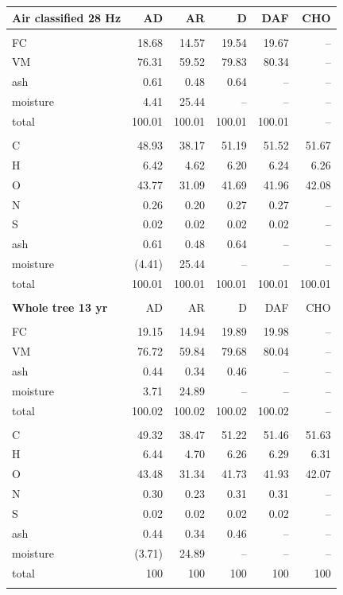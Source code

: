 \begin{longtable}{lrrrrr}
    \textbf{Air classified 28 Hz} & AD & AR & D & DAF & CHO \\
    \hline \\
    FC       & 18.68  & 14.57  & 19.54  & 19.67  & -- \\
    VM       & 76.31  & 59.52  & 79.83  & 80.34  & -- \\
    ash      & 0.61   & 0.48   & 0.64   & --     & -- \\
    moisture & 4.41   & 25.44  & --     & --     & -- \\
    total    & 100.01 & 100.01 & 100.01 & 100.01 & -- \\
    \\
    C        & 48.93  & 38.17  & 51.19  & 51.52  & 51.67 \\
    H        & 6.42   & 4.62   & 6.20   & 6.24   & 6.26 \\
    O        & 43.77  & 31.09  & 41.69  & 41.96  & 42.08 \\
    N        & 0.26   & 0.20   & 0.27   & 0.27   & -- \\
    S        & 0.02   & 0.02   & 0.02   & 0.02   & -- \\
    ash      & 0.61   & 0.48   & 0.64   & --     & -- \\
    moisture & (4.41) & 25.44  & --     & --     & -- \\
    total    & 100.01 & 100.01 & 100.01 & 100.01 & 100.01 \\
    \\

    \textbf{Whole tree 13 yr} & AD & AR & D & DAF & CHO \\
    \hline \\
    FC       & 19.15  & 14.94  & 19.89  & 19.98  & -- \\
    VM       & 76.72  & 59.84  & 79.68  & 80.04  & -- \\
    ash      & 0.44   & 0.34   & 0.46   & --     & -- \\
    moisture & 3.71   & 24.89  & --     & --     & -- \\
    total    & 100.02 & 100.02 & 100.02 & 100.02 & -- \\
    \\
    C        & 49.32  & 38.47  & 51.22  & 51.46  & 51.63 \\
    H        & 6.44   & 4.70   & 6.26   & 6.29   & 6.31 \\
    O        & 43.48  & 31.34  & 41.73  & 41.93  & 42.07 \\
    N        & 0.30   & 0.23   & 0.31   & 0.31   & -- \\
    S        & 0.02   & 0.02   & 0.02   & 0.02   & -- \\
    ash      & 0.44   & 0.34   & 0.46   & --     & -- \\
    moisture & (3.71) & 24.89  & --     & --     & -- \\
    total    & 100    & 100    & 100    & 100    & 100 \\
    \\


\end{longtable}
